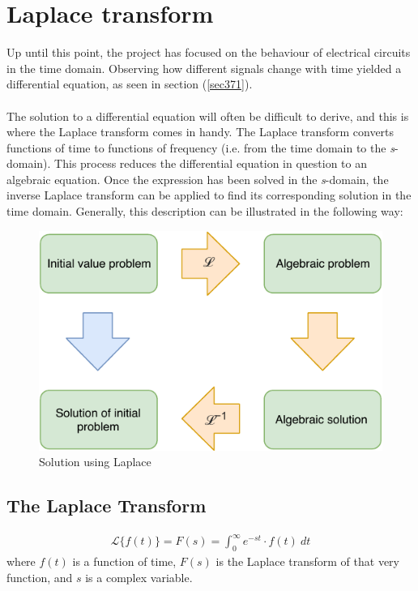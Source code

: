 \chapter{Laplace transform}
Up until this point, the project has focused on the behaviour of electrical circuits in the time domain. Observing how different signals change with time yielded a differential equation, as seen in section (\ref{sec371}).
\\ \\
The solution to a differential equation will often be difficult to derive, and this is where the Laplace transform comes in handy. The Laplace transform converts functions of time to functions of frequency (i.e. from the time domain to the \textit{s}-domain). This process reduces the differential equation in question to an algebraic equation. Once the expression has been solved in the \textit{s}-domain, the inverse Laplace transform can be applied to find its corresponding solution in the time domain. Generally, this description can be illustrated in the following way:
\begin{figure}[H]
 \center
 \includegraphics[scale=1]{fig/img/laplace_circ.pdf}
 \caption{Solution using Laplace}
\end{figure}

\section{The Laplace Transform}
\begin{tcolorbox}[colback=blue!5!white,colframe=blue!75!black,title=Definition]
\begin{align}
\mathcal{L}\{f(t)\}=F(s)=\int_{0}^{\infty} e^{-st}\cdot f(t)\ dt
\label{lpdef}
\end{align}
where $f(t)$ is a function of time, $F(s)$ is the Laplace transform of that very function, and $s$ is a complex variable.
\end{tcolorbox}

